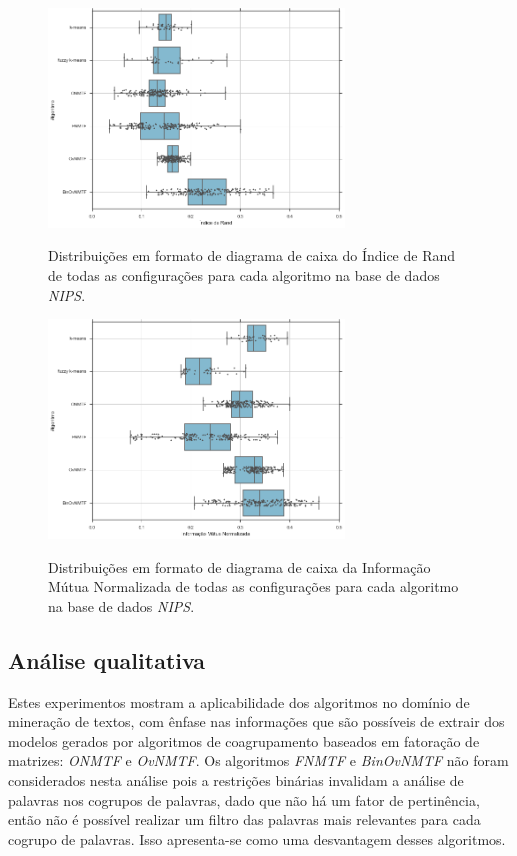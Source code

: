 \documentclass[
    12pt,                %
    oneside,            %
    a4paper,            %
    english,            %
    brazil                %
    ]{abntex2ppgsi}
\begin{document}
\begin{figure}[H]
    \centering
    \caption{Distribuições em formato de diagrama de caixa do Índice de Rand de todas as configurações para cada algoritmo na base de dados \textit{NIPS}.}
    \includegraphics[width=0.7\textwidth]{img/boxplot-all-rand-nips.png}
    \label{fig:boxplot-all-rand:nips}
\end{figure}

\begin{figure}[H]
    \centering
    \caption{Distribuições em formato de diagrama de caixa da Informação Mútua Normalizada de todas as configurações para cada algoritmo na base de dados \textit{NIPS}.}
    \includegraphics[width=0.7\textwidth]{img/boxplot-all-nmi-nips.png}
    \label{fig:boxplot-all-nmi:nips}
\end{figure}

\subsection{Análise qualitativa}

Estes experimentos mostram a aplicabilidade dos algoritmos no domínio de mineração de textos, com ênfase nas informações que são possíveis de extrair dos modelos gerados por algoritmos de coagrupamento baseados em fatoração de matrizes: \textit{ONMTF} e \textit{OvNMTF}.
Os algoritmos \textit{FNMTF} e \textit{BinOvNMTF} não foram considerados nesta análise pois a restrições binárias invalidam a análise de palavras nos cogrupos de palavras, dado que não há um fator de pertinência, então não é possível realizar um filtro das palavras mais relevantes para cada cogrupo de palavras.
Isso apresenta-se como uma desvantagem desses algoritmos.
\end{document}
